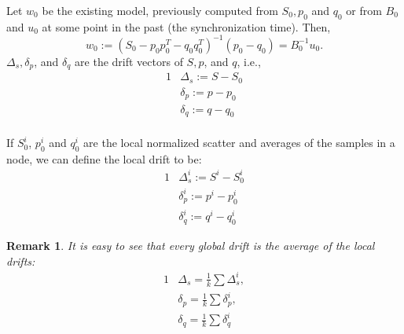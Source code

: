 \documentclass[11pt,twocolumn,varwidth=true,a4paper,fleqn]{article}
\newtheorem{remark}{Remark}
\begin{document}
Let $w_0$ be the existing model, previously computed from $S_0, p_0$ and $q_0$
or from $B_0$ and $u_0$ at some point in the past (the synchronization time).
Then,
\begin{equation*} 
w_0:=(S_0 - p_0p_0^T - q_0q_0^T)^{-1}(p_0-q_0)=B_0^{-1}u_0.
\end{equation*}
$\Delta_s, \delta_p$, and $\delta_q$ are the drift vectors of $S, p$, and $q$,
i.e.,
\begin{alignat*}{1}
& \Delta_s:= S - S_0 \\
& \delta_p:= p - p_0 \\
& \delta_q := q - q_0
\end{alignat*}
\\If $S_0^i$, $p_0^i$ and $q_0^i$ are the local normalized scatter and averages
of the samples in a node, we can define the local drift to be:
\begin{alignat*}{1}
& \Delta_s^i:= S^i - S_0^i
\\ & \delta_p^i:= p^i - p_0^i
\\ & \delta_q^i:= q^i - q_0^i
\end{alignat*}
\begin{remark} \label{average}
It is easy to see that every global drift is the average of the local drifts:
\begin{alignat*}{1}
& \Delta_s = \frac{1}{k} \sum \Delta_s^i, \\
& \delta_p = \frac{1}{k} \sum \delta_p^i, \\
& \delta_q = \frac{1}{k} \sum \delta_q^i 
\end{alignat*}

\end{remark}
\end{document}
